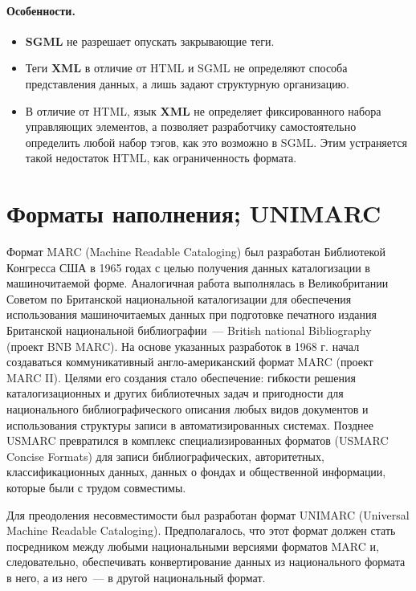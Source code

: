 \documentclass[12pt]{article}
\theoremstyle{definition}
\theoremstyle{remark}
\numberwithin{equation}{section}
\begin{document}
\paragraph{Особенности.}
\begin{itemize}
	\item \textbf{SGML} не разрешает опускать закрывающие теги.
	\item Теги \textbf{XML} в отличие от HTML и SGML не определяют способа представления данных, а лишь задают структурную организацию.
	\item В отличие от HTML, язык \textbf{XML} не определяет фиксированного набора управляющих элементов, а позволяет разработчику самостоятельно определить любой набор тэгов, как это возможно в SGML. Этим устраняется такой недостаток HTML, как ограниченность формата. 
\end{itemize}

\section{Форматы наполнения; UNIMARC}
Формат MARC (Machine Readable Cataloging) был разработан Библиотекой Конгресса США в 1965 годах с целью получения данных каталогизации в машиночитаемой форме. Аналогичная работа выполнялась в Великобритании Советом по Британской национальной каталогизации для обеспечения использования машиночитаемых данных при подготовке печатного издания Британской национальной библиографии~--- British national Bibliography (проект BNB MARC). На основе указанных разработок в 1968 г. начал создаваться коммуникативный англо\nobreakdash-американский формат MARC (проект MARC II). Целями его создания стало обеспечение: гибкости решения каталогизационных и других библиотечных задач и пригодности для национального библиографического описания любых видов документов и использования структуры записи в автоматизированных системах. Позднее USMARC превратился в комплекс специализированных форматов (USMARC Concise Formats) для записи библиографических, авторитетных, классификационных данных, данных о фондах и общественной информации, которые были с трудом совместимы.

Для преодоления несовместимости был разработан формат UNIMARC (Universal Machine Readable Cataloging). Предполагалось, что этот формат должен стать посредником между любыми национальными версиями форматов MARC и, следовательно, обеспечивать конвертирование данных из национального формата в него, а из него~--- в другой национальный формат.
\end{document}
